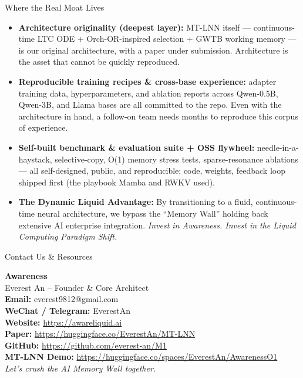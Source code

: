 \documentclass[aspectratio=169, 10pt]{beamer}
\begin{document}
\begin{frame}{Where the Real Moat Lives}
\small
\begin{itemize}\itemsep=0.4em
    \item \textbf{Architecture originality (deepest layer):} MT-LNN itself --- continuous-time LTC ODE + Orch-OR-inspired selection + GWTB working memory --- is our original architecture, with a paper under submission. Architecture is the asset that cannot be quickly reproduced.
    \item \textbf{Reproducible training recipes \& cross-base experience:} adapter training data, hyperparameters, and ablation reports across Qwen-0.5B, Qwen-3B, and Llama bases are all committed to the repo. Even with the architecture in hand, a follow-on team needs months to reproduce this corpus of experience.
    \item \textbf{Self-built benchmark \& evaluation suite + OSS flywheel:} needle-in-a-haystack, selective-copy, O(1) memory stress tests, sparse-resonance ablations --- all self-designed, public, and reproducible; code, weights, feedback loop shipped first (the playbook Mamba and RWKV used).
    \vspace{0.4em}
    \item \textbf{The Dynamic Liquid Advantage:} By transitioning to a fluid, continuous-time neural architecture, we bypass the ``Memory Wall'' holding back extensive AI enterprise integration. \textit{Invest in Awareness. Invest in the Liquid Computing Paradigm Shift.}
\end{itemize}
\end{frame}

\begin{frame}{Contact Us \& Resources}
\begin{center}
    \LARGE \textbf{Awareness} \\
    \vspace{0.5em}
    \large Everest An -- Founder \& Core Architect \\
    \vspace{1.5em}
    \normalsize
    \textbf{Email:} everest9812@gmail.com \\
    \textbf{WeChat / Telegram:} EverestAn \\
    \vspace{1.5em}
    \small
    \textbf{Website:} \url{https://awareliquid.ai} \\
    \textbf{Paper:} \url{https://huggingface.co/EverestAn/MT-LNN} \\
    \textbf{GitHub:} \url{https://github.com/everest-an/M1} \\
    \textbf{MT-LNN Demo:} \url{https://huggingface.co/spaces/EverestAn/AwarenessO1} \\
    \vspace{1.5em}
    \textit{Let's crush the AI Memory Wall together.}
\end{center}
\end{frame}
\end{document}
